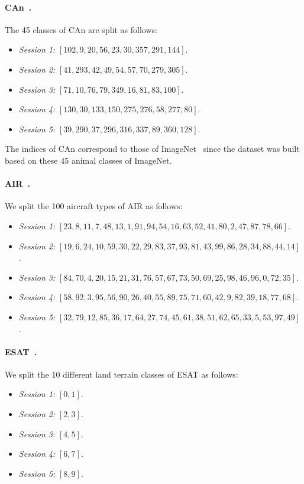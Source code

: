 \paragraph{CAn~\cite{wang2024clips}.} The 45 classes of CAn are split as follows:
\begin{itemize}
    \item \emph{Session 1:} $\left[ 102, 9, 20, 56, 23, 30, 357, 291, 144 \right]$.
    \item \emph{Session 2:} $\left[ 41, 293, 42, 49, 54, 57, 70, 279, 305 \right]$.
    \item \emph{Session 3:} $\left[ 71, 10, 76, 79, 349, 16, 81, 83, 100 \right]$.
    \item \emph{Session 4:} $\left[ 130, 30, 133, 150, 275, 276, 58, 277, 80 \right]$.
    \item \emph{Session 5:} $\left[ 39, 290, 37, 296, 316, 337, 89, 360, 128 \right]$.
\end{itemize}
The indices of CAn correspond to those of ImageNet~\cite{imagenet} since the dataset was built based on these 45 animal classes of ImageNet.

\paragraph{AIR~\cite{maji13fine-grained}.} We split the 100 aircraft types of AIR as follows:
\begin{itemize}
    \item \emph{Session 1:} $\left[ 23, 8, 11, 7, 48, 13, 1, 91, 94, 54, 16, 63, 52, 41, 80, 2, 47, 87, 78, 66 \right]$.
    \item \emph{Session 2:} $\left[ 19, 6, 24, 10, 59, 30, 22, 29, 83, 37, 93, 81, 43, 99, 86, 28, 34, 88, 44, 14 \right]$.
    \item \emph{Session 3:} $\left[ 84, 70, 4, 20, 15, 21, 31, 76, 57, 67, 73, 50, 69, 25, 98, 46, 96, 0, 72, 35 \right]$.
    \item \emph{Session 4:} $\left[ 58, 92, 3, 95, 56, 90, 26, 40, 55, 89, 75, 71, 60, 42, 9, 82, 39, 18, 77, 68 \right]$.
    \item \emph{Session 5:} $\left[ 32, 79, 12, 85, 36, 17, 64, 27, 74, 45, 61, 38, 51, 62, 65, 33, 5, 53, 97, 49 \right]$.
\end{itemize}

\paragraph{ESAT~\cite{helber2019eurosat}.} We split the 10 different land terrain classes of ESAT as follows:
\begin{itemize}
    \item \emph{Session 1:} $\left[ 0, 1 \right]$.
    \item \emph{Session 2:} $\left[ 2, 3 \right]$.
    \item \emph{Session 3:} $\left[ 4, 5 \right]$.
    \item \emph{Session 4:} $\left[ 6, 7 \right]$.
    \item \emph{Session 5:} $\left[ 8, 9 \right]$.
\end{itemize}

